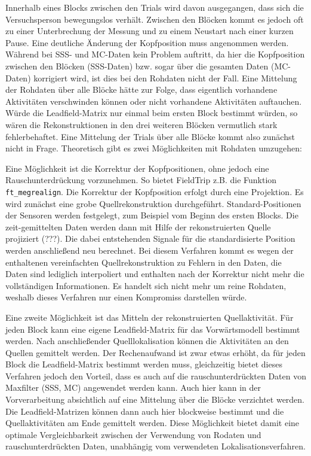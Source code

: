 \documentclass[doc,a4paper,12pt]{apa6}
\begin{document}
Innerhalb eines Blocks zwischen den Trials wird davon ausgegangen, dass sich die Versuchsperson bewegungslos verhält. Zwischen den Blöcken kommt es jedoch oft zu einer Unterbrechung der Messung und zu einem Neustart nach einer kurzen Pause. Eine deutliche Änderung der Kopfposition muss angenommen werden. Während bei SSS- und MC-Daten kein Problem auftritt, da hier die Kopfposition zwischen den Blöcken (SSS-Daten) bzw. sogar über die gesamten Daten (MC-Daten) korrigiert wird, ist dies bei den Rohdaten nicht der Fall. Eine Mittelung der Rohdaten über alle Blöcke hätte zur Folge, dass eigentlich vorhandene Aktivitäten verschwinden können oder nicht vorhandene Aktivitäten auftauchen. Würde die Leadfield-Matrix nur einmal beim ersten Block bestimmt würden, so wären die Rekonstruktionen in den drei weiteren Blöcken vermutlich stark fehlerbehaftet. Eine Mittelung der Trials über alle Blöcke kommt also zunächst nicht in Frage. Theoretisch gibt es zwei Möglichkeiten mit Rohdaten umzugehen:

Eine Möglichkeit ist die Korrektur der Kopfpositionen, ohne jedoch eine Rauschunterdrückung vorzunehmen. So bietet FieldTrip z.B. die Funktion \texttt{ft\_megrealign}. Die Korrektur der Kopfposition erfolgt durch eine Projektion. Es wird zunächst eine grobe Quellrekonstruktion durchgeführt. Standard-Positionen der Sensoren werden festgelegt, zum Beispiel vom Beginn des ersten Blocks. Die zeit-gemittelten Daten werden dann mit Hilfe der rekonstruierten Quelle projiziert (???). Die dabei entstehenden Signale für die standardisierte Position werden anschließend neu berechnet. Bei diesem Verfahren kommt es wegen der enthaltenen vereinfachten Quellrekonstruktion zu Fehlern in den Daten, die Daten sind lediglich interpoliert und enthalten nach der Korrektur nicht mehr die vollständigen Informationen. Es handelt sich nicht mehr um reine Rohdaten, weshalb dieses Verfahren nur einen Kompromiss darstellen würde.


Eine zweite Möglichkeit ist das Mitteln der rekonstruierten Quellaktivität. Für jeden Block kann eine eigene Leadfield-Matrix für das Vorwärtsmodell bestimmt werden. Nach anschließender Quelllokalisation können die Aktivitäten an den Quellen gemittelt werden. Der Rechenaufwand ist zwar etwas erhöht, da für jeden Block die Leadfield-Matrix bestimmt werden muss, gleichzeitig bietet dieses Verfahren jedoch den Vorteil, dass es auch auf die rauschunterdrückten Daten von Maxfilter (SSS, MC) angewendet werden kann. Auch hier kann in der Vorverarbeitung absichtlich auf eine Mittelung über die Blöcke verzichtet werden. Die Leadfield-Matrizen können dann auch hier blockweise bestimmt und die Quellaktivitäten am Ende gemittelt werden. Diese Möglichkeit bietet damit eine optimale Vergleichbarkeit zwischen der Verwendung von Rodaten und rauschunterdrückten Daten, unabhängig vom verwendeten Lokalisationsverfahren.
\end{document}
